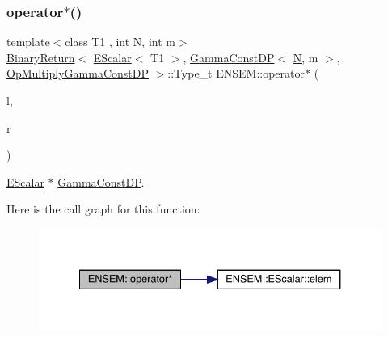 \subsubsection{\texorpdfstring{operator$\ast$()}{operator*()}\hspace{0.1cm}{\footnotesize\ttfamily [7/9]}}
{\footnotesize\ttfamily template$<$class T1 , int N, int m$>$ \\
\mbox{\hyperlink{structENSEM_1_1BinaryReturn}{Binary\+Return}}$<$ \mbox{\hyperlink{classENSEM_1_1EScalar}{E\+Scalar}}$<$ T1 $>$, \mbox{\hyperlink{classENSEM_1_1GammaConstDP}{Gamma\+Const\+DP}}$<$ \mbox{\hyperlink{operator__name__util_8cc_a7722c8ecbb62d99aee7ce68b1752f337}{N}}, m $>$, \mbox{\hyperlink{structENSEM_1_1OpMultiplyGammaConstDP}{Op\+Multiply\+Gamma\+Const\+DP}} $>$\+::Type\+\_\+t E\+N\+S\+E\+M\+::operator$\ast$ (\begin{DoxyParamCaption}\item[{const \mbox{\hyperlink{classENSEM_1_1EScalar}{E\+Scalar}}$<$ T1 $>$ \&}]{l,  }\item[{const \mbox{\hyperlink{classENSEM_1_1GammaConstDP}{Gamma\+Const\+DP}}$<$ \mbox{\hyperlink{operator__name__util_8cc_a7722c8ecbb62d99aee7ce68b1752f337}{N}}, m $>$ \&}]{r }\end{DoxyParamCaption})\hspace{0.3cm}{\ttfamily [inline]}}



\mbox{\hyperlink{classENSEM_1_1EScalar}{E\+Scalar}} $\ast$ \mbox{\hyperlink{classENSEM_1_1GammaConstDP}{Gamma\+Const\+DP}}. 

Here is the call graph for this function\+:
\nopagebreak
\begin{figure}[H]
\begin{center}
\leavevmode
\includegraphics[width=334pt]{d4/dca/group__escalar_gaa60096d471282c83dab865d42b53ce96_cgraph}
\end{center}
\end{figure}
\mbox{\label{group__escalar_ga54ffca46c333d9dad30043eb6cef6299}} 
